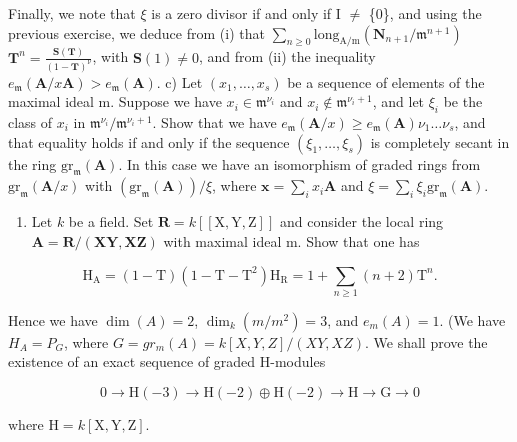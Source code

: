 Finally, we note that \(\xi\) is a zero divisor if and only if I \(\neq\) \{0\}, and using the previous exercise, we deduce from (i) that \(\sum_{n\geqslant 0}\mathrm{long}_{\mathrm{A / m}}(\mathbf{N}_{n + 1} / \mathfrak{m}^{n + 1})\) \(\mathbf{T}^n = \frac{\mathbf{S}(\mathbf{T})}{(1 - \mathbf{T})^\nu}\), with \(\mathbf{S}(1)\neq 0\), and from (ii) the inequality \(e_{\mathfrak{m}}(\mathbf{A} / x\mathbf{A}) > e_{\mathfrak{m}}(\mathbf{A})\). c) Let \((x_{1},\dots,x_{s})\) be a sequence of elements of the maximal ideal m. Suppose we have \(x_{i}\in \mathfrak{m}^{\nu_i}\) and \(x_{i}\notin \mathfrak{m}^{\nu_i + 1}\), and let \(\xi_{i}\) be the class of \(x_{i}\) in \(\mathfrak{m}^{\nu_i} / \mathfrak{m}^{\nu_i + 1}\). Show that we have \(e_{\mathfrak{m}}(\mathbf{A} / x)\geqslant e_{\mathfrak{m}}(\mathbf{A})\nu_{1}\dots \nu_{s}\), and that equality holds if and only if the sequence \((\xi_1,\dots,\xi_s)\) is completely secant in the ring \(\mathrm{gr}_{\mathfrak{m}}(\mathbf{A})\). In this case we have an isomorphism of graded rings from \(\mathrm{gr}_{\mathfrak{m}}(\mathbf{A} / x)\) with \((\mathrm{gr}_{\mathfrak{m}}(\mathbf{A}))/\xi\), where \(\mathbf{x} = \sum_{i}x_{i}\mathbf{A}\) and \(\xi = \sum_{i}\xi_{i}\mathrm{gr}_{\mathfrak{m}}(\mathbf{A})\).

\begin{enumerate}
\def\labelenumi{\arabic{enumi})}
\setcounter{enumi}{4}
\tightlist
\item
  Let \(k\) be a field. Set \(\mathbf{R} = k[[\mathrm{X},\mathrm{Y},\mathrm{Z}]]\) and consider the local ring \(\mathbf{A} = \mathbf{R}/(\mathbf{XY},\mathbf{X}\mathbf{Z})\) with maximal ideal m. Show that one has
\end{enumerate}

\[
\mathrm{H} _ {\mathrm{A}} = (1 - \mathrm{T}) (1 - \mathrm{T} - \mathrm{T} ^ {2}) \mathrm{H} _ {\mathrm{R}} = 1 + \sum_ {n \geqslant 1} (n + 2) \mathrm{T} ^ {n}.
\]

Hence we have \(\dim(A) = 2\), \(\dim_k(m/m^2) = 3\), and \(e_m(A) = 1\). (We have \(H_A = P_G\), where \(G = gr_m(A) = k[X, Y, Z]/(XY, XZ)\). We shall prove the existence of an exact sequence of graded H-modules

\[
0 \rightarrow \mathrm{H} (- 3) \rightarrow \mathrm{H} (- 2) \oplus \mathrm{H} (- 2) \rightarrow \mathrm{H} \rightarrow \mathrm{G} \rightarrow 0
\]

\(\text{where } \mathrm{H} = k[\mathrm{X},\mathrm{Y},\mathrm{Z}].\)

